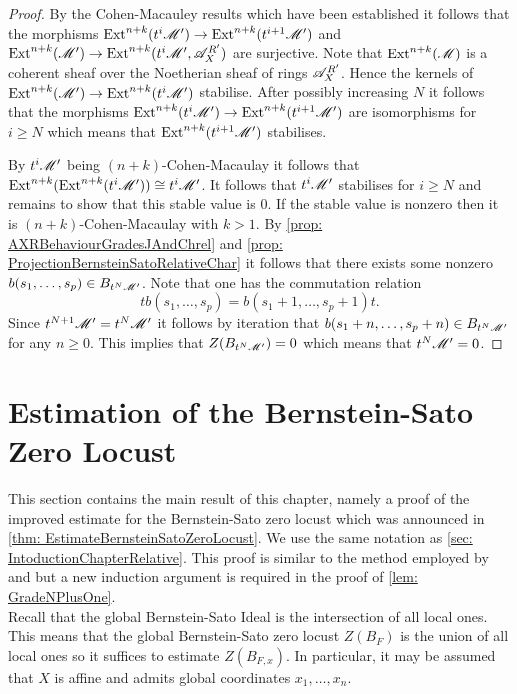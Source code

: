 \begin{proof}
  By the Cohen-Macauley results which have been established it follows that the morphisms $\operatorname{Ext}^{n+k}( t^i\mathscr{M}') \to  \operatorname{Ext}^{n+k}(t^{i+1}\mathscr{M}')$ and $\operatorname{Ext}^{n+k}(\mathscr{M}') \to \operatorname{Ext}^{n+k} (t^i\mathscr{M}',\allowbreak \mathscr{A}_X^{R'})$ are surjective.
  Note that $\operatorname{Ext}^{n+k}(\mathscr{M})$ is a coherent sheaf over the Noetherian sheaf of rings $\mathscr{A}_X^{R'}$.
  Hence the kernels of $\operatorname{Ext}^{n+k}(\mathscr{M}') \to \operatorname{Ext}^{n+k} (t^i\mathscr{M}')$ stabilise.
  After possibly increasing $N$ it follows that the morphisms $\operatorname{Ext}^{n+k}(t^i\mathscr{M}') \to  \operatorname{Ext}^{n+k}(t^{i+1}\mathscr{M}')$ are isomorphisms for $i\geq N$ which means that $\operatorname{Ext}^{n+k}(t^{i+1}\mathscr{M}')$ stabilises.

  By $t^i \mathscr{M}'$ being $(n+k)$-Cohen-Macaulay it follows that $\operatorname{Ext}^{n+k}(\operatorname{Ext}^{n+k}(t^i\mathscr{M}')) \cong t^i\mathscr{M}'$.
  It follows that $t^i \mathscr{M}'$ stabilises for $i\geq N$ and remains to show that this stable value is $0$.
  If the stable value is nonzero then it is $(n+k)$-Cohen-Macaulay with $k>1$.
  By \cref{prop: AXRBehaviourGradesJAndChrel} and \cref{prop: ProjectionBernsteinSatoRelativeChar} it follows that there exists some nonzero $b(s_1,\ldots,s_p) \in B_{t^N\mathscr{M}'}$.
  Note that one has the commutation relation
  $$tb(s_1,\ldots,s_p) = b(s_1+1,\ldots, s_p + 1)t.$$
  Since $t^{N+1}\mathscr{M}' = t^N\mathscr{M}'$ it follows by iteration that $b(s_1+n,\ldots, s_p + n)\in B_{t^N \mathscr{M}'}$ for any $n\geq 0$.
  This implies that $Z(B_{t^N\mathscr{M}'}) = 0$ which means that $t^N\mathscr{M}' = 0$.
\end{proof}
\section{Estimation of the Bernstein-Sato Zero Locust}
This section contains the main result of this chapter, namely a proof of the improved estimate for the Bernstein-Sato zero locust which was announced in \cref{thm: EstimateBernsteinSatoZeroLocust}.
We use the same notation as \cref{sec: IntoductionChapterRelative}.
This proof is similar to the method employed by \cite{lichtin1989poles} and \cite{kashiwara1976b} but a new induction argument is required in the proof of \cref{lem: GradeNPlusOne}.\\

\noindent
Recall that the global Bernstein-Sato Ideal is the intersection of all local ones.
This means that the global Bernstein-Sato zero locust $Z(B_F)$ is the union of all local ones so it suffices to estimate $Z(B_{F,x})$.
In particular, it may be assumed that $X$ is affine and admits global coordinates $x_1,\ldots,x_n$.

